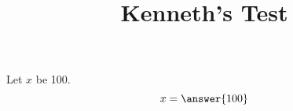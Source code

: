 \documentclass{ximera}
\title{Kenneth's Test}
\begin{document}
\begin{exercise}
Let $x$ be 100.
\[ x = \answer{100}\]
\end{exercise}
\end{document}
